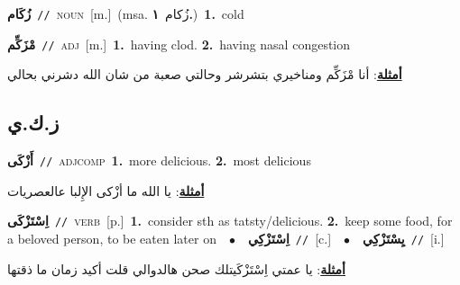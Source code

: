 \documentclass[10pt,a4paper,twoside]{article} %
\begin{document}
\begin{multicols}{2}
{\setlength\topsep{0pt}\textbf{\foreignlanguage{arabic}{زُكَام}}\ {\color{gray}\texttt{//}\color{black}}\ \textsc{noun}\ [m.]\ \color{gray}(msa. \foreignlanguage{arabic}{زُكام}~\foreignlanguage{arabic}{\textbf{١.}})\color{black}\ \textbf{1.}~cold\ } \vspace{2mm}

{\setlength\topsep{0pt}\textbf{\foreignlanguage{arabic}{مْزَكِّم}}\ {\color{gray}\texttt{//}\color{black}}\ \textsc{adj}\ [m.]\ \textbf{1.}~having clod.  \textbf{2.}~having nasal congestion\  \begin{flushright}\color{gray}\foreignlanguage{arabic}{\textbf{\underline{\foreignlanguage{arabic}{أمثلة}}}: أنا مْزَكِّم ومناخيري بتشرشر وحالتي صعبة من شان الله دشرني بحالي}\end{flushright}\color{black}} \vspace{2mm}

\vspace{-3mm}
\subsection*{\color{blue}\foreignlanguage{arabic}{ز.ك.ي}\color{blue}{}} 

{\setlength\topsep{0pt}\textbf{\foreignlanguage{arabic}{أَزْكَى}}\ {\color{gray}\texttt{//}\color{black}}\ \textsc{adj\textunderscore comp}\ \textbf{1.}~more delicious.  \textbf{2.}~most delicious\  \begin{flushright}\color{gray}\foreignlanguage{arabic}{\textbf{\underline{\foreignlanguage{arabic}{أمثلة}}}: يا الله ما أزْكى الإِلبا عالعصريات}\end{flushright}\color{black}} \vspace{2mm}

{\setlength\topsep{0pt}\textbf{\foreignlanguage{arabic}{اِسْتَزْكَى}}\ {\color{gray}\texttt{//}\color{black}}\ \textsc{verb}\ [p.]\ \textbf{1.}~consider sth as tatsty/delicious.  \textbf{2.}~keep some food, for a beloved person, to be eaten later on\ \ $\bullet$\ \ \setlength\topsep{0pt}\textbf{\foreignlanguage{arabic}{اِسْتَزْكِي}}\ {\color{gray}\texttt{//}\color{black}}\ [c.]\ \ $\bullet$\ \ \setlength\topsep{0pt}\textbf{\foreignlanguage{arabic}{يِسْتَزْكِي}}\ {\color{gray}\texttt{//}\color{black}}\ [i.]\  \begin{flushright}\color{gray}\foreignlanguage{arabic}{\textbf{\underline{\foreignlanguage{arabic}{أمثلة}}}: يا عمتي اِسْتَزْكَيتلك صحن هالدوالي قلت أكيد زمان ما ذقتها}\end{flushright}\color{black}} \vspace{2mm}


\end{multicols}
\end{document}

